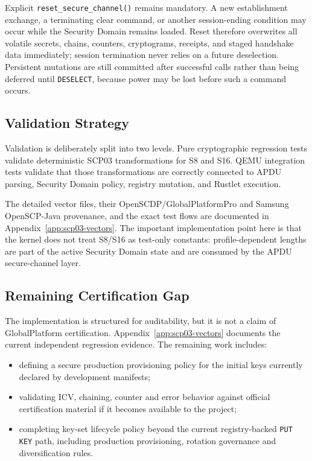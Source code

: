 Explicit \texttt{reset\_secure\_channel()} remains mandatory. A new
establishment exchange, a terminating clear command, or another session-ending
condition may occur while the Security Domain remains loaded. Reset therefore
overwrites all volatile secrets, chains, counters, cryptograms, receipts, and
staged handshake data immediately; session termination never relies on a
future deselection. Persistent mutations are still committed after successful
calls rather than being deferred until \texttt{DESELECT}, because power may be
lost before such a command occurs.

\subsection{Validation Strategy}
\label{sec:impl-scp-validation}

Validation is deliberately split into two levels. Pure cryptographic regression
tests validate deterministic SCP03 transformations for S8 and S16. QEMU
integration tests validate that those transformations are correctly connected
to APDU parsing, Security Domain policy, registry mutation, and Rustlet
execution.

The detailed vector files, their OpenSCDP/GlobalPlatformPro and Samsung
OpenSCP-Java provenance, and the exact test flows are documented in
Appendix~\ref{app:scp03-vectors}. The
important implementation point here is that the kernel does not treat S8/S16
as test-only constants: profile-dependent lengths are part of the active
Security Domain state and are consumed by the APDU secure-channel layer.

\subsection{Remaining Certification Gap}
\label{sec:impl-scp-certification-gap}

The implementation is structured for auditability, but it is not a claim of
GlobalPlatform certification. Appendix~\ref{app:scp03-vectors} documents the
current independent regression evidence. The remaining work includes:

\begin{itemize}
\item defining a secure production provisioning policy for the initial keys
      currently declared by development manifests;
\item validating ICV, chaining, counter and error behavior against official
      certification material if it becomes available to the project;
\item completing key-set lifecycle policy beyond the current registry-backed
      \texttt{PUT KEY} path, including production provisioning, rotation
      governance and diversification rules.
\end{itemize}

